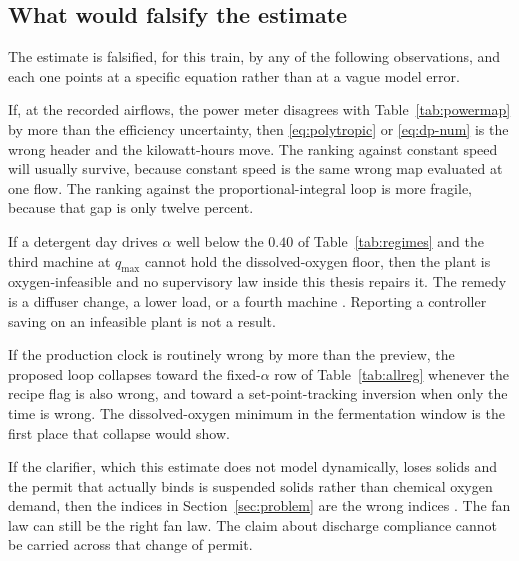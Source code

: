 \subsection{What would falsify the estimate}

The estimate is falsified, for this train, by any of the following observations, and each one points at a specific equation rather than at a vague model error.

If, at the recorded airflows, the power meter disagrees with Table~\ref{tab:powermap} by more than the efficiency uncertainty, then \eqref{eq:polytropic} or \eqref{eq:dp-num} is the wrong header and the kilowatt-hours move. The ranking against constant speed will usually survive, because constant speed is the same wrong map evaluated at one flow. The ranking against the proportional-integral loop is more fragile, because that gap is only twelve percent.

If a detergent day drives $\alpha$ well below the $0.40$ of Table~\ref{tab:regimes} and the third machine at $q_{\max}$ cannot hold the dissolved-oxygen floor, then the plant is oxygen-infeasible and no supervisory law inside this thesis repairs it. The remedy is a diffuser change, a lower load, or a fourth machine \cite{rosso2006alpha,mueller2002aeration,rosso2008state}. Reporting a controller saving on an infeasible plant is not a result.

If the production clock is routinely wrong by more than the preview, the proposed loop collapses toward the fixed-$\alpha$ row of Table~\ref{tab:allreg} whenever the recipe flag is also wrong, and toward a set-point-tracking inversion when only the time is wrong. The dissolved-oxygen minimum in the fermentation window is the first place that collapse would show.

If the clarifier, which this estimate does not model dynamically, loses solids and the permit that actually binds is suspended solids rather than chemical oxygen demand, then the indices in Section~\ref{sec:problem} are the wrong indices \cite{takacs1991,tchobanoglous2014}. The fan law can still be the right fan law. The claim about discharge compliance cannot be carried across that change of permit.

